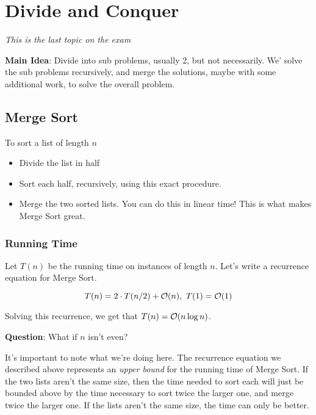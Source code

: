 \documentclass[12pt]{article}
\begin{document}
  \section{Divide and Conquer}
  {\it This is the last topic on the exam}

  {\bf Main Idea}: Divide into sub problems, usually 2, but not necessarily. We'
  solve the sub problems recursively, and merge the solutions, maybe with some
  additional work, to solve the overall problem.

  \subsection{Merge Sort}

  To sort a list of length $n$
  \begin{itemize}
    \item Divide the list in half
    \item Sort each half, recursively, using this exact procedure.
    \item Merge the two sorted lists. You can do this in linear time! This is what makes
      Merge Sort great.
  \end{itemize}

  \subsubsection{Running Time}

  Let $T(n)$ be the running time on instances of length $n$. Let's write a
  recurrence equation for Merge Sort.

  \[
    T(n) = 2 \cdot T(n / 2) + \mathcal O(n), \, \, T(1) = \mathcal O(1)
  \]


  Solving this recurrence, we get that $T(n) = \mathcal O(n \log n)$.

  {\bf Question}: What if $n$ isn't even?

  It's important to note what we're doing here. The recurrence equation we
  described above represents an {\it upper bound} for the running time of Merge
  Sort. If the two lists aren't the same size, then the time needed to sort each
  will just be bounded above by the time necessary to sort twice the larger one,
  and merge twice the larger one. If the lists aren't the same size, the time
  can only be better.
\end{document}
